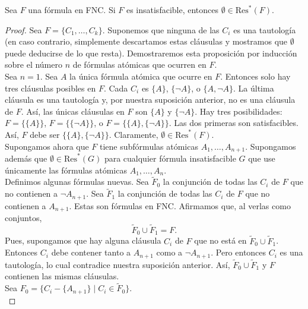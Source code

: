 \documentclass[12pt,a4paper]{book}
\begin{document}
    \begin{proposicion}\label{prop:insatisfacible-implica-vacio}
        Sea $F$ una fórmula en FNC. Si $F$ es insatisfacible, entonces $\emptyset\in\mathrm{Res}^{*}(F)$.
    \end{proposicion}
    \begin{proof}
        Sea $F=\{C_{1},\dots,C_{k}\}$. Suponemos que ninguna de las $C_{i}$ es una tautología (en caso contrario,
        simplemente descartamos estas cláusulas y mostramos que $\emptyset$ puede deducirse de lo que resta). Demostraremos
        esta proposición por inducción sobre el número $n$ de fórmulas atómicas que ocurren en $F$.\\
        Sea $n=1$. Sea $A$ la única fórmula atómica que ocurre en $F$. Entonces solo hay tres cláusulas posibles en $F$. Cada
        $C_{i}$ es $\{A\}$, $\{\neg A\}$, o $\{A,\neg A\}$. La última cláusula es una tautología y, por nuestra suposición
        anterior, no es una cláusula de $F$. Así, las únicas cláusulas en $F$ son $\{A\}$ y $\{\neg A\}$. Hay tres
        posibilidades: $F=\{\{A\}\}$, $F=\{\{\neg A\}\}$, o $F=\{\{A\},\{\neg A\}\}$. Las dos primeras son satisfacibles. Así,
        $F$ debe ser $\{\{A\},\{\neg A\}\}$. Claramente, $\emptyset\in\mathrm{Res}^{*}(F)$.\\
        Supongamos ahora que $F$ tiene subfórmulas atómicas $A_{1},\dots,A_{n+1}$. Supongamos además que
        $\emptyset\in\mathrm{Res}^{*}(G)$ para cualquier fórmula insatisfacible $G$ que use únicamente las fórmulas atómicas
        $A_{1},\dots,A_{n}$.\\
        Definimos algunas fórmulas nuevas. Sea $\widetilde{F}_{0}$ la conjunción de todas las $C_{i}$ de $F$ que no
        contienen a $\neg A_{n+1}$. Sea $\widetilde{F}_{1}$ la conjunción de todas las $C_{i}$ de $F$ que no contienen a
        $A_{n+1}$. Estas son fórmulas en FNC. Afirmamos que, al verlas como conjuntos,
        \begin{equation*}
            \widetilde{F}_{0}\cup\widetilde{F}_{1}=F.
        \end{equation*}
        Pues, supongamos que hay alguna cláusula $C_{i}$ de $F$ que no está en $\widetilde{F}_{0}\cup\widetilde{F}_{1}$.
        Entonces $C_{i}$ debe contener tanto a $A_{n+1}$ como a $\neg A_{n+1}$. Pero entonces $C_{i}$ es una tautología, lo
        cual contradice nuestra suposición anterior. Así, $\widetilde{F}_{0}\cup\widetilde{F}_{1}$ y $F$ contienen las mismas
        cláusulas.\\
        Sea $F_{0}=\{C_{i}-\{A_{n+1}\}\mid C_{i}\in\widetilde{F}_{0}\}$.\\

\end{proof}
\end{document}
